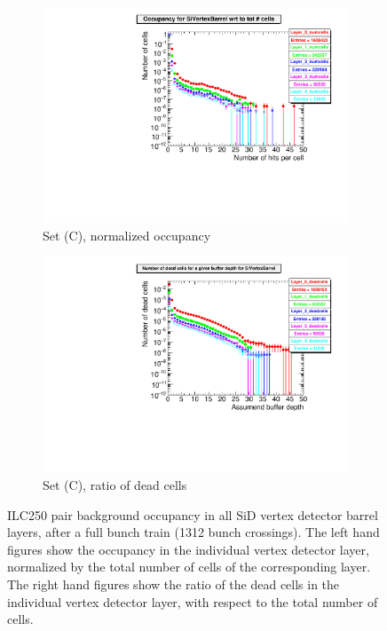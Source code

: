 \begin{figure}[htb]
\begin{subfigure}[b]{0.49\textwidth}
    \includegraphics[width=\textwidth]{Figures/Pairs/Appendix/occupancy_numcells_SiVertexBarrel_ILC250_SetC.pdf}
   \caption{Set (C), normalized occupancy}
   \end{subfigure}
   \hfill
    \begin{subfigure}[b]{0.49\textwidth}
   \centering
   \includegraphics[width=\textwidth]{Figures/Pairs/Appendix/occupancy_deadcells_SiVertexBarrel_ILC250_SetC.pdf}
   \caption{Set (C), ratio of dead cells}
   \end{subfigure}
   \caption[Pair background occupancy in all SiD vertex detector barrel layers for the ILC250]{ILC250 pair background occupancy in all SiD vertex detector barrel layers, after a full bunch train (1312 bunch crossings).
   The left hand figures show the occupancy in the individual vertex detector layer, normalized by the total number of cells of the corresponding layer.
   The right hand figures show the ratio of the dead cells in the individual vertex detector layer, with respect to the total number of cells.
   }
   \label{fig:PairBkg:ILC250_Occupancy_Layers_VXDBarrel}
 \end{figure}
 
